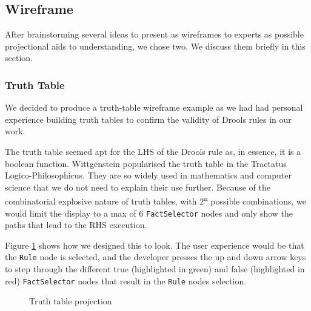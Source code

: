 \subsection{Wireframe}

After brainstorming several ideas to present as wireframes to experts as possible projectional aids to understanding, we chose two.
We discuss them briefly in this section.

\subsubsection{Truth Table}
We decided to produce a truth-table wireframe example as we had had personal experience building truth tables to confirm the validity of Drools rules in our work.

The truth table seemed apt for the LHS of the Drools rule as, in essence, it is a boolean function.
Wittgenstein popularised the truth table in the Tractatus Logico-Philosophicus\cite{wittgenstein2013tractatus}.
They are so widely used in mathematics and computer science that we do not need to explain their use further.
Because of the combinatorial explosive nature of truth tables, with 2\textsuperscript{n} possible combinations, we would limit the display to a max of 6 \texttt{FactSelector} nodes and only show the paths that lead to the RHS execution.

Figure \ref{fig:TruthTableProjection} shows how we designed this to look.
The user experience would be that the \texttt{Rule} node is selected, and the developer presses the up and down arrow keys to step through the different true (highlighted in green) and false (highlighted in red) \texttt{FactSelector} nodes that result in the \texttt{Rule} nodes selection.

\begin{figure}[h]
    \centering
    \caption{Truth table projection}
    \label{fig:TruthTableProjection}
\end{figure}

